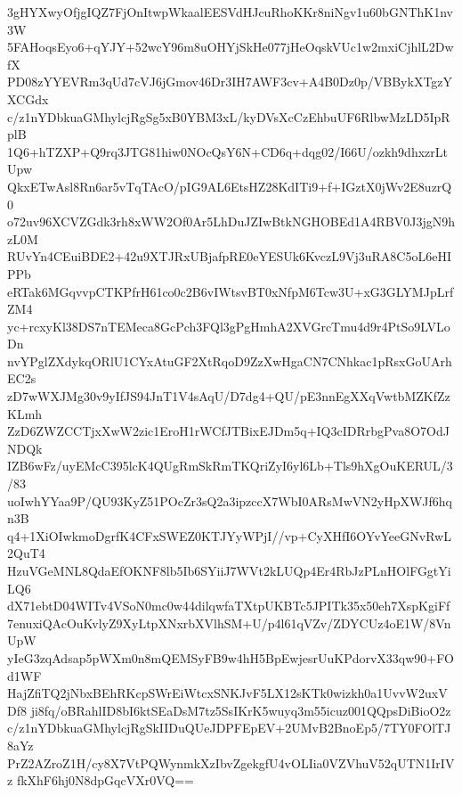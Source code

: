 3gHYXwyOfjgIQZ7FjOnItwpWkaalEESVdHJcuRhoKKr8niNgv1u60bGNThK1nv3W
5FAHoqsEyo6+qYJY+52wcY96m8uOHYjSkHe077jHeOqskVUc1w2mxiCjhlL2DwfX
PD08zYYEVRm3qUd7cVJ6jGmov46Dr3IH7AWF3cv+A4B0Dz0p/VBBykXTgzYXCGdx
c/z1nYDbkuaGMhylcjRgSg5xB0YBM3xL/kyDVsXcCzEhbuUF6RlbwMzLD5IpRplB
1Q6+hTZXP+Q9rq3JTG81hiw0NOcQsY6N+CD6q+dqg02/I66U/ozkh9dhxzrLtUpw
QkxETwAsl8Rn6ar5vTqTAcO/pIG9AL6EtsHZ28KdITi9+f+IGztX0jWv2E8uzrQ0
o72uv96XCVZGdk3rh8xWW2Of0Ar5LhDuJZIwBtkNGHOBEd1A4RBV0J3jgN9hzL0M
RUvYn4CEuiBDE2+42u9XTJRxUBjafpRE0eYESUk6KvczL9Vj3uRA8C5oL6eHIPPb
eRTak6MGqvvpCTKPfrH61co0c2B6vIWtsvBT0xNfpM6Tcw3U+xG3GLYMJpLrfZM4
yc+rcxyKl38DS7nTEMeca8GcPch3FQl3gPgHmhA2XVGrcTmu4d9r4PtSo9LVLoDn
nvYPglZXdykqORlU1CYxAtuGF2XtRqoD9ZzXwHgaCN7CNhkac1pRsxGoUArhEC2s
zD7wWXJMg30v9yIfJS94JnT1V4sAqU/D7dg4+QU/pE3nnEgXXqVwtbMZKfZzKLmh
ZzD6ZWZCCTjxXwW2zic1EroH1rWCfJTBixEJDm5q+IQ3cIDRrbgPva8O7OdJNDQk
IZB6wFz/uyEMcC395lcK4QUgRmSkRmTKQriZyI6yl6Lb+Tls9hXgOuKERUL/3/83
uoIwhYYaa9P/QU93KyZ51POcZr3sQ2a3ipzccX7WbI0ARsMwVN2yHpXWJf6hqn3B
q4+1XiOIwkmoDgrfK4CFxSWEZ0KTJYyWPjI//vp+CyXHfI6OYvYeeGNvRwL2QuT4
HzuVGeMNL8QdaEfOKNF8lb5Ib6SYiiJ7WVt2kLUQp4Er4RbJzPLnHOlFGgtYiLQ6
dX71ebtD04WITv4VSoN0mc0w44dilqwfaTXtpUKBTc5JPITk35x50eh7XspKgiFf
7enuxiQAcOuKvlyZ9XyLtpXNxrbXVlhSM+U/p4l61qVZv/ZDYCUz4oE1W/8VnUpW
yIeG3zqAdsap5pWXm0n8mQEMSyFB9w4hH5BpEwjesrUuKPdorvX33qw90+FOd1WF
HajZfiTQ2jNbxBEhRKcpSWrEiWtcxSNKJvF5LX12sKTk0wizkh0a1UvvW2uxVDf8
ji8fq/oBRahlID8bI6ktSEaDsM7tz5SsIKrK5wuyq3m55icuz001QQpsDiBioO2z
c/z1nYDbkuaGMhylcjRgSkIIDuQUeJDPFEpEV+2UMvB2BnoEp5/7TY0FOlTJ8aYz
PrZ2AZroZ1H/cy8X7VtPQWynmkXzIbvZgekgfU4vOLIia0VZVhuV52qUTN1IrIVz
fkXhF6hj0N8dpGqcVXr0VQ==
